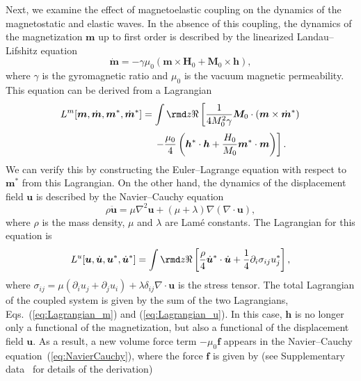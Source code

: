 \documentclass[10pt]{iopart}
\begin{document}
Next, we examine the effect of magnetoelastic coupling on the dynamics of the magnetostatic and elastic waves. In the absence of this coupling, the dynamics of the magnetization $\bm{m}$ up to first order is described by the linearized Landau--Lifshitz equation
\begin{equation}
    \dot{\bm{m}}=-\gamma\mu_0\left(\bm{m}\times\bm{H}_0+\bm{M}_0\times\bm{h}\right),\label{eq:LandauLifshitz}
\end{equation}
where $\gamma$ is the gyromagnetic ratio and $\mu_0$ is the vacuum magnetic permeability. This equation can be derived from a Lagrangian
\begin{equation*}
    L^m[\bm{m},\dot{\bm{m}},\bm{m}^*,\dot{\bm{m}}^*]=\int\rmd z\Re\left[\frac{1}{4M_0^2\gamma}\bm{M}_0\cdot(\bm{m}\times\dot{\bm{m}}^*)\right.
\end{equation*}
\begin{equation}
    \hspace{2.9cm}\left.-\frac{\mu_0}{4}\left(\bm{h}^*\cdot\bm{h}+\frac{H_0}{M_0}\bm{m}^*\cdot\bm{m}\right)\right].\label{eq:Lagrangian_m}
\end{equation}
We can verify this by constructing the Euler--Lagrange equation with respect to $\bm{m}^*$ from this Lagrangian. On the other hand, the dynamics of the displacement field $\bm{u}$ is described by the Navier--Cauchy equation
\begin{equation}
    \rho\ddot{\bm{u}}=\mu\nabla^2\bm{u}+\left(\mu+\lambda\right)\nabla\left(\nabla\cdot\bm{u}\right),\label{eq:NavierCauchy}
\end{equation}
where $\rho$ is the mass density, $\mu$ and $\lambda$ are Lam\'e constants. The Lagrangian for this equation is
\begin{equation}
    L^u[\bm{u},\dot{\bm{u}},\bm{u}^*,\dot{\bm{u}}^*]=\int\rmd z\Re\left[\frac{\rho}{4}\dot{\bm{u}}^*\cdot\dot{\bm{u}}+\frac{1}{4}\partial_i\sigma_{ij}u_j^*\right],\label{eq:Lagrangian_u}
\end{equation}
where $\sigma_{ij}=\mu(\partial_i u_j+\partial_j u_i)+\lambda\delta_{ij}\nabla\cdot\bm{u}$ is the stress tensor. The total Lagrangian of the coupled system is given by the sum of the two Lagrangians, Eqs.~(\ref{eq:Lagrangian_m}) and (\ref{eq:Lagrangian_u}). In this case, $\bm{h}$ is no longer only a functional of the magnetization, but also a functional of the displacement field $\bm{u}$. As a result, a new volume force term $-\mu_0\bm{f}$ appears in the Navier--Cauchy equation~(\ref{eq:NavierCauchy}), where the force $\bm{f}$ is given by (see Supplementary data~\cite{SM} for details of the derivation)
\end{document}
